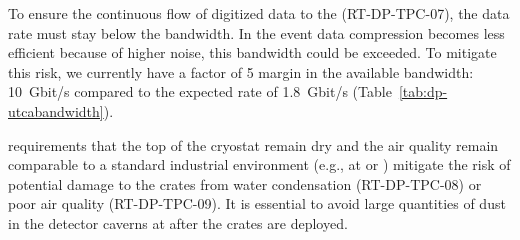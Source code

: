 To ensure the continuous flow of digitized data to the  (RT-DP-TPC-07), the data rate must stay below the  bandwidth. In the event data compression becomes less efficient because of higher noise, this bandwidth could be exceeded. To mitigate this risk, we currently have a factor of \num{5} margin in the available bandwidth: \SI{10}{Gbit/s}  compared to the expected rate of \SI{1.8}{Gbit/s} (Table~\ref{tab:dp-utcabandwidth}).

 requirements that the top of the cryostat remain dry and the air quality remain comparable to a standard industrial environment (e.g., at  or ) mitigate the risk of potential damage to the  crates from water condensation (RT-DP-TPC-08) or poor air quality (RT-DP-TPC-09). It is essential to avoid large quantities of dust in the detector caverns at  after the  crates are deployed.
